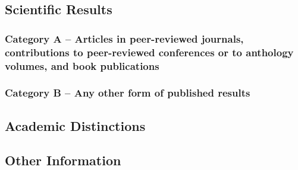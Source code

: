 \documentclass{scrartcl}
\begin{document}
\subsection*{Scientific Results}
\nocite{*}

\subsubsection*{Category A -- Articles in peer-reviewed journals, contributions to peer-reviewed conferences or to anthology volumes, and book publications}
\printbibliography[category=reviewed, heading=none]

\subsubsection*{Category B -- Any other form of published results}
\printbibliography[category=nonreviewed, heading=none, resetnumbers=true]

\subsection*{Academic Distinctions}

\subsection*{Other Information}
\end{document}
